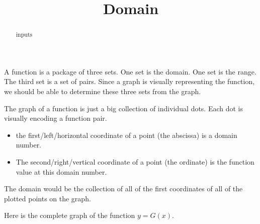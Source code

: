 \documentclass{ximera}
\title{Domain}
\begin{document}
\begin{abstract}
inputs
\end{abstract}
\maketitle


A function is a package of three sets.  One set is the domain. One set is the range. The third set is a set of pairs. Since a graph is visually representing the function, we should be able to determine these three sets from the graph.


The graph of a function is just a big collection of individual dots. Each dot is visually encoding a function pair. 



\begin{itemize}
     \item the first/left/horizontal coordinate of a point (the abscissa) is a domain number.
     \item The second/right/vertical coordinate of a point (the ordinate) is the function value at this domain number.
\end{itemize}



The domain would be the collection of all of the first coordinates of all of the plotted points on the graph. 






Here is the complete graph of the function $y=G(x)$. 
\end{document}
